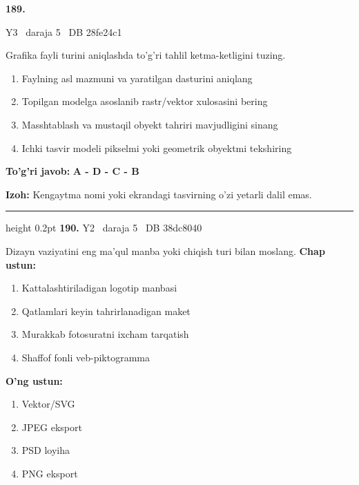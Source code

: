 \documentclass[10pt,a4paper,oneside]{article}
\begin{document}
\hypertarget{q189}{\textbf{\color{ink}189.}}  {\color{muted}\scriptsize Y3 \textbullet\ daraja 5 \textbullet\ DB 28fe24c1}
\par
Grafika fayli turini aniqlashda to'g'ri tahlil ketma-ketligini tuzing.
\begin{enumerate}[label=\Alph*),leftmargin=9mm]
\item Faylning asl mazmuni va yaratilgan dasturini aniqlang
\item Topilgan modelga asoslanib rastr/vektor xulosasini bering
\item Masshtablash va mustaqil obyekt tahriri mavjudligini sinang
\item Ichki tasvir modeli pikselmi yoki geometrik obyektmi tekshiring
\end{enumerate}
\begin{tcolorbox}[enhanced,breakable,colback=teal!4,colframe=teal!45!black,boxrule=0.45pt,arc=1.2mm,left=2.8mm,right=2.8mm,top=2mm,bottom=2mm,before skip=2mm,after skip=2mm]
\textbf{\color{teal}To'g'ri javob:} \textbf{A - D - C - B}
\par\smallskip
\textbf{Izoh:} Kengaytma nomi yoki ekrandagi tasvirning o'zi yetarli dalil emas.
\end{tcolorbox}
\vspace{2mm}\hrule height 0.2pt \vspace{4mm}
\hypertarget{q190}{\textbf{\color{ink}190.}}  {\color{muted}\scriptsize Y2 \textbullet\ daraja 5 \textbullet\ DB 38dc8040}
\par
Dizayn vaziyatini eng ma'qul manba yoki chiqish turi bilan moslang.
\textbf{\footnotesize Chap ustun:}
\begin{enumerate}[label=\arabic*),leftmargin=9mm]
\item Kattalashtiriladigan logotip manbasi
\item Qatlamlari keyin tahrirlanadigan maket
\item Murakkab fotosuratni ixcham tarqatish
\item Shaffof fonli veb-piktogramma
\end{enumerate}
\textbf{\footnotesize O'ng ustun:}
\begin{enumerate}[label=\Alph*),leftmargin=9mm]
\item Vektor/SVG
\item JPEG eksport
\item PSD loyiha
\item PNG eksport
\end{enumerate}
\end{document}
